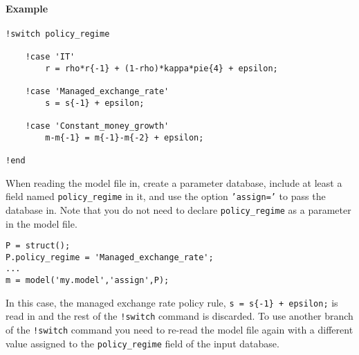 \paragraph{Example}

\begin{verbatim}
!switch policy_regime

    !case 'IT'
        r = rho*r{-1} + (1-rho)*kappa*pie{4} + epsilon;

    !case 'Managed_exchange_rate'
        s = s{-1} + epsilon;

    !case 'Constant_money_growth'
        m-m{-1} = m{-1}-m{-2} + epsilon;
   
!end
\end{verbatim}

When reading the model file in, create a parameter database, include at
least a field named \texttt{policy\_regime} in it, and use the option
\texttt{'assign='} to pass the database in. Note that you do not need to
declare \texttt{policy\_regime} as a parameter in the model file.

\begin{verbatim}
P = struct();
P.policy_regime = 'Managed_exchange_rate';
...
m = model('my.model','assign',P);
\end{verbatim}

In this case, the managed exchange rate policy rule,
\texttt{s = s\{-1\} + epsilon;} is read in and the rest of the
\texttt{!switch} command is discarded. To use another branch of the
\texttt{!switch} command you need to re-read the model file again with a
different value assigned to the \texttt{policy\_regime} field of the
input database.


